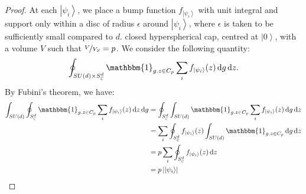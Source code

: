 \documentclass{amsart}
\theoremstyle{definition}
\newcommand{\ket}[1]{{\left\vert{#1}\right\rangle}}
\newcommand*\dif{\mathop{}\!\mathrm{d}}
\begin{document}
\begin{proof}
At each $\ket{\psi_i}$, we place a bump function $f_\ket{\psi_i}$ with unit integral and support only within a disc of radius $\epsilon$ around $\ket{\psi_i}$, where $\epsilon$ is taken to be sufficiently small compared to $d$.
closed hyperspherical cap, centred at $\ket{0}$, with a volume $V$ such that $\nicefrac{V}{V_S}=p$. We consider the following quantity:
\begin{equation}
\oint_{SU(d)\times S_\mathbb{C}^d} \mathbbm{1}_{g.z\in C_p} \sum_i f_\ket{\psi_i}(z) \dif g\dif z.
\end{equation}
By Fubini's theorem, we have:
\begin{align}
\int_{SU(d)} \oint_{S_\mathbb{C}^d} \mathbbm{1}_{g.z\in C_p} \sum_i f_\ket{\psi_i}(z) \dif z \dif g &= \oint_{S_\mathbb{C}^d} \int_{SU(d)}  \mathbbm{1}_{g.z\in C_p} \sum_i f_\ket{\psi_i}(z) \dif g \dif z \\
 &= \sum_i\oint_{S_\mathbb{C}^d}f_\ket{\psi_i}(z)  \int_{SU(d)} \mathbbm{1}_{g.z\in C_p} \dif g \dif z \label{eqn:1} \\
 &= p\sum_i\oint_{S_\mathbb{C}^d}f_\ket{\psi_i}(z)  \dif z \label{eqn:2} \\
&= p\left|\ket{\psi_i}\right|
\end{align}



\end{proof}
\end{document}
